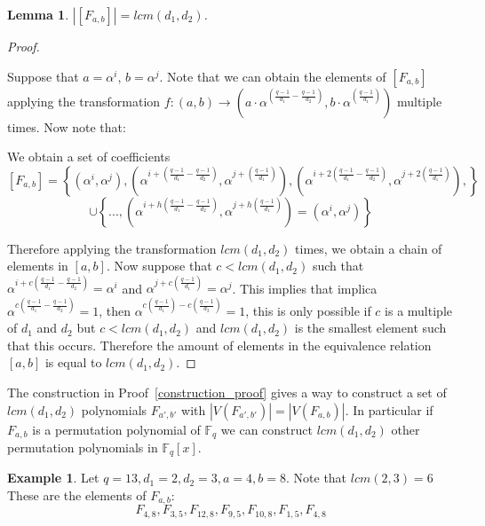 \documentclass{article}
\newtheorem{lemma}[theorem]{Lemma}
\theoremstyle{definition}
\newtheorem{example}[theorem]{Example}
\theoremstyle{remark}
\numberwithin{equation}{section}
\begin{document}
\begin{lemma}
  
  $|[F_{a, b}]| = lcm(d_1,d_2)$.

\end{lemma}

\begin{proof}\label{construction_proof}

  Suppose that $a=\alpha^i$, $b=\alpha^j$. Note that we can obtain the elements of $[F_{a,b}]$ applying the transformation $f:(a,b) \rightarrow ( a\cdot\alpha^{(\frac{q-1}{d_1} - \frac{q-1}{d_2})}, b\cdot\alpha^{(\frac{q-1}{d_1})} )$ multiple times. Now note that:

  We obtain a set of coefficients 
  $$[F_{a,b}] = \left\{ (\alpha^i,\alpha^j), (\alpha^{i+(\frac{q-1}{d_1} - \frac{q-1}{d_2})}, \alpha^{j+(\frac{q-1}{d_1})}), (\alpha^{i+2(\frac{q-1}{d_1} - \frac{q-1}{d_2})}, \alpha^{j+2(\frac{q-1}{d_1})}),\right\}$$ 
  $$ \cup \left\{..., (\alpha^{i+h(\frac{q-1}{d_1} - \frac{q-1}{d_2})}, \alpha^{j+h(\frac{q-1}{d_1})}) = (\alpha^i, \alpha^j) \right\}$$

  Therefore applying the transformation $lcm(d_1,d_2)$ times, we obtain a chain of elements in $[a,b]$. Now suppose that $c < lcm(d_1,d_2)$ such that $\alpha^{i+c(\frac{q-1}{d_1} - \frac{q-1}{d_2})} = \alpha^i$ and $\alpha^{j+c(\frac{q-1}{d_1})} = \alpha^j$. This implies that implica $\alpha^{c(\frac{q-1}{d_1} - \frac{q-1}{d_2})} = 1$, then $\alpha^{c(\frac{q-1}{d_1}) - c(\frac{q-1}{d_2})} = 1$, this is only possible if $c$ is a multiple of $d_1$ and $d_2$ but $c < lcm(d_1,d_2)$ and $lcm(d_1,d_2)$ is the smallest element such that this occurs. Therefore the amount of elements in the equivalence relation $[a,b]$ is equal to $lcm(d_1,d_2)$.
  
\end{proof}

The construction in Proof~\ref{construction_proof} gives a way to construct a set of $lcm(d_1,d_2)$ polynomials $F_{a',b'}$ with $|V(F_{a',b'})| = |V(F_{a,b})|$. In particular if $F_{a,b}$ is a permutation polynomial of $\mathbb{F}_q$ we can construct $lcm(d_1, d_2)$ other permutation polynomials in $\mathbb{F}_q[x]$.

 \begin{example}
    Let $q = 13, d_1 = 2, d_2 = 3, a = 4, b = 8$. Note that $lcm(2,3) = 6$ These are the elements of $F_{a,b}$:
    $$ F_{4, 8}, F_{3, 5}, F_{12, 8}, F_{9, 5}, F_{10, 8}, F_{1, 5}, F_{4,8} $$
  \end{example}
\end{document}
